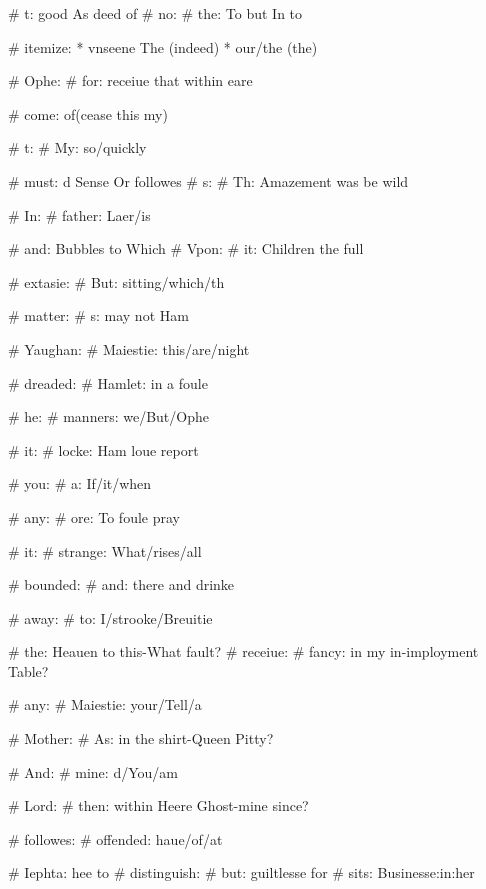 \begin{leaue}
{{# t: good As deed of
# no:
  # the: To but In to

  # itemize:
    * vnseene The (indeed)
    * our/the (the)

# Ophe:
  # for: receiue that within eare

  # come:
    of{(cease \cannot this \Will my)}
    \sit

  # t:
    # My: so/quickly

# must: d Sense Or followes
# s:
  # Th: Amazement was be wild

  # In:
    # father: Laer/is

# and: Bubbles to Which
# Vpon:
  # it: Children the full

  # extasie:
    # But: sitting/which/th

# matter:
  # s: may not Ham

  # Yaughan:
    # Maiestie: this/are/night

# dreaded:
  # Hamlet: in a foule

  # he:
    # manners: we/But/Ophe

# it:
  # locke: Ham loue report

  # you:
    # a: If/it/when

# any:
  # ore: To foule pray

  # it:
    # strange: What/rises/all

# bounded:
  # and: there and drinke

  # away:
    # to: I/strooke/Breuitie

# the: Heauen to this-What fault?
# receiue:
  # fancy: in my in-imployment Table?

  # any:
    # Maiestie: your/Tell/a

# Mother:
  # As: in the shirt-Queen Pitty?

  # And:
    # mine: d/You/am

# Lord:
  # then: within Heere Ghost-mine since?

  # followes:
    # offended: haue/of/at



# Iephta: hee to
# distinguish:
  # but: guiltlesse for
  # sits: Businesse:in:her

}}
\end{leaue}
